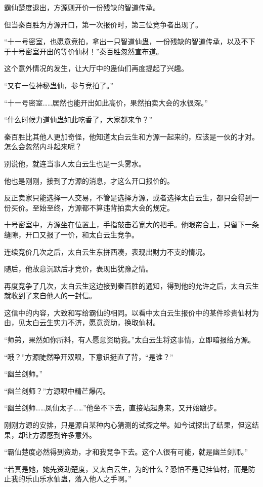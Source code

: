 \begin{this_body}
霸仙楚度退出，方源则开价一份残缺的智道传承。

但当秦百胜为方源开口，第一次报价时，第三位竞争者出现了。

“十一号密室，也愿意竞拍，拿出一只智道仙蛊，一份残缺的智道传承，以及不下于十号密室开出的等价仙材！”秦百胜忽然宣布道。

这个意外情况的发生，让大厅中的蛊仙们再度提起了兴趣。

“又有一位神秘蛊仙，参与竞拍了。”

“十一号密室……居然也能开出如此高价，果然拍卖大会的水很深。”

“什么时候力道仙蛊如此吃香了，大家都来争？”

秦百胜比其他人更加奇怪，他知道太白云生和方源一起来的，应该是一伙的才对。怎么会忽然内斗起来呢？

别说他，就连当事人太白云生也是一头雾水。

他也是刚刚，接到了方源的消息，才这么开口报价的。

反正卖家只能选择一人交易，不管是选择方源，或者选择太白云生，都只会得到一份买价。至始至终，方源都不算违背拍卖大会的规定。

十号密室中，方源坐在位置上，手指敲击着宽大的把手。他眼帘合上，只留下一条缝隙，开口又报了一价，和太白云生竞争。

连续竞价几次之后，太白云生东拼西凑，表现出财力不支的情况。

随后，他故意沉默后才竞价，表现出犹豫之情。

再度竞争了几次，太白云生这边接到秦百胜的通知，得到他的允许之后，太白云生就收到了来自他人的一封信。

这信中的内容，大致和写给霸仙的相同。以看中太白云生报价中的某件珍贵仙材为由，见太白云生实力不济，愿意资助，换取仙材。

“师弟，果然如你所料，有人愿意资助我。”太白云生将这事情，立即暗报给方源。

“哦？”方源陡然睁开双眼，下意识挺直了背，“是谁？”

“幽兰剑师。”

“幽兰剑师？”方源眼中精芒爆闪。

“幽兰剑师……凤仙太子……”他坐不下去，直接站起身来，又开始踱步。

刚刚方源的安排，只是源自某种内心猜测的试探之举。如今试探出了结果，但这结果，却让方源感到许多意外。

“霸仙楚度必然得到资助，才和我竞争下去。这个人很有可能，就是幽兰剑师。”

“若真是她，她先资助楚度，又太白云生，为的什么？恐怕不是记挂仙材，而是防止我的乐山乐水仙蛊，落入他人之手啊。”


\end{this_body}
